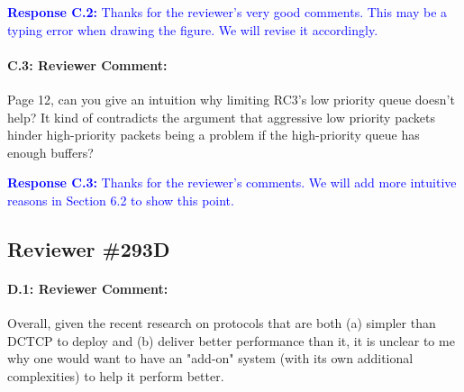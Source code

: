 \documentclass[12pt,one-column]{article}
\begin{document}
\noindent\textcolor{blue}{\textbf{Response C.2:}
Thanks for the reviewer’s very good comments. 
This may be a typing error when drawing the figure.
We will revise it accordingly.
}

{\it \paragraph{C.3: Reviewer Comment:} Page 12, can you give an intuition why limiting RC3’s low priority queue doesn’t help? It kind of contradicts the argument that aggressive low priority packets hinder high-priority packets being a problem if the high-priority queue has enough buffers?}


\noindent\textcolor{blue}{\textbf{Response C.3:}
Thanks for the reviewer's comments. 
We will add more intuitive reasons in Section 6.2 to show this point.
}


\subsection{Reviewer \#293D}

{\it \paragraph{D.1: Reviewer Comment:}Overall, given the recent research on protocols that are both (a) simpler than DCTCP to deploy and (b) deliver better performance than it, it is unclear to me why one would want to have an "add-on" system (with its own additional complexities) to help it perform better.}
\end{document}
